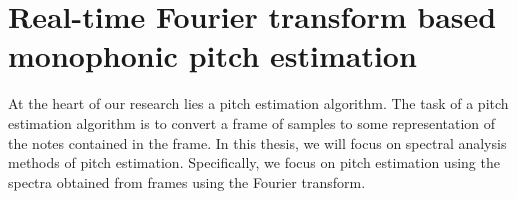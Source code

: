 \documentclass[a4paper,10pt,twocolumn]{article}
\begin{document}



\section{Real-time Fourier transform based monophonic pitch estimation}
At the heart of our research lies a pitch estimation algorithm. The task of a pitch estimation algorithm is to convert a frame of samples to some representation of the notes contained in the frame. In this thesis, we will focus on spectral analysis methods of pitch estimation. Specifically, we focus on pitch estimation using the spectra obtained from frames using the Fourier transform.




\end{document}
